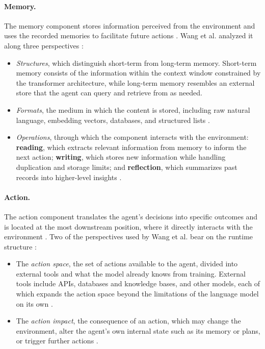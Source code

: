 \paragraph{Memory.} The memory component stores information perceived from the environment and uses the recorded memories to facilitate future actions \cite{wangSurveyLargeLanguage2024}. Wang et al. analyzed it along three perspectives \cite{wangSurveyLargeLanguage2024}:
\begin{itemize}
    \item \emph{Structures}, which distinguish short-term from long-term memory. Short-term memory consists of the information within the context window constrained by the transformer architecture, while long-term memory resembles an external store that the agent can query and retrieve from as needed.
    \item \emph{Formats}, the medium in which the content is stored, including raw natural language, embedding vectors, databases, and structured lists \cite{wangSurveyLargeLanguage2024}.
    \item \emph{Operations}, through which the component interacts with the environment: \textbf{reading}, which extracts relevant information from memory to inform the next action; \textbf{writing}, which stores new information while handling duplication and storage limits; and \textbf{reflection}, which summarizes past records into higher-level insights \cite{wangSurveyLargeLanguage2024}.
\end{itemize}

\paragraph{Action.} The action component translates the agent's decisions into specific outcomes and is located at the most downstream position, where it directly interacts with the environment \cite{wangSurveyLargeLanguage2024}. Two of the perspectives used by Wang et al. bear on the runtime structure \cite{wangSurveyLargeLanguage2024}:
\begin{itemize}
    \item The \emph{action space}, the set of actions available to the agent, divided into external tools and what the model already knows from training. External tools include APIs, databases and knowledge bases, and other models, each of which expands the action space beyond the limitations of the language model on its own \cite{wangSurveyLargeLanguage2024}.
    \item The \emph{action impact}, the consequence of an action, which may change the environment, alter the agent's own internal state such as its memory or plans, or trigger further actions \cite{wangSurveyLargeLanguage2024}.
\end{itemize}

